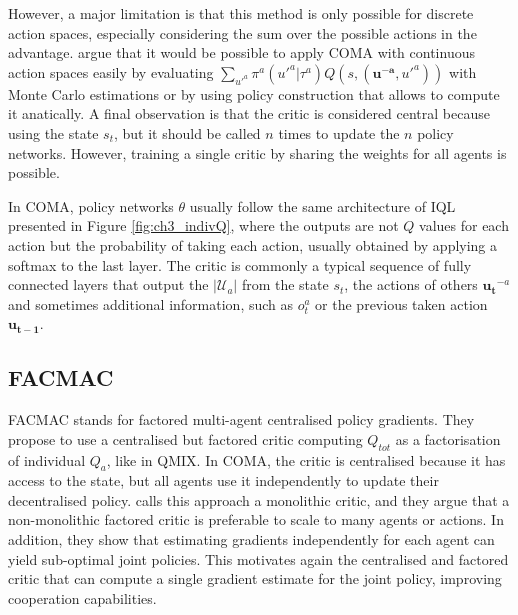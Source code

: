 However, a major limitation is that this method is only possible for discrete action spaces, especially considering the sum over the possible actions in the advantage.
\cite{foerster2017coma} argue that it would be possible to apply COMA with continuous action spaces easily by evaluating $\sum_{u'^{a}} \pi^a(u'^{a}|\tau^a) Q(s,(\mathbf{u^{-a}},u'^{a}))$ with Monte Carlo estimations or by using policy construction that allows to compute it anatically.
A final observation is that the critic is considered central because using the state $s_t$, but it should be called $n$ times to update the $n$ policy networks.
However, training a single critic by sharing the weights for all agents is possible.

In COMA, policy networks $\theta$ usually follow the same architecture of IQL presented in Figure \ref{fig:ch3_indivQ}, where the outputs are not $Q$ values for each action but the probability of taking each action, usually obtained by applying a softmax to the last layer.
The critic is commonly a typical sequence of fully connected layers that output the $|\mathcal{U}_a|$ from the state $s_t$, the actions of others $\boldsymbol{u_t}^{-a}$ and sometimes additional information, such as $o_t^a$ or the previous taken action $\boldsymbol{u_{t-1}}$.

\subsection{FACMAC}

FACMAC \citep{peng2021facmac} stands for factored multi-agent centralised policy gradients.
They propose to use a centralised but factored critic computing $Q_{tot}$ as a factorisation of individual $Q_a$, like in QMIX.
In COMA, the critic is centralised because it has access to the state, but all agents use it independently to update their decentralised policy.
\cite{peng2021facmac} calls this approach a monolithic critic, and they argue that a non-monolithic factored critic is preferable to scale to many agents or actions.
In addition, they show that estimating gradients independently for each agent can yield sub-optimal joint policies.
This motivates again the centralised and factored critic that can compute a single gradient estimate for the joint policy, improving cooperation capabilities.

